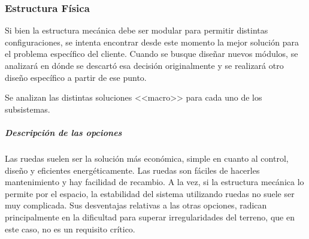 
\subsubsection{Estructura Física}

Si bien la estructura mecánica debe ser modular para permitir distintas configuraciones, se intenta encontrar desde este momento la mejor solución para el problema específico del cliente. Cuando se busque diseñar nuevos módulos, se analizará en dónde se descartó esa decisión originalmente y se realizará otro diseño específico a partir de ese punto.

Se analizan las distintas soluciones <<macro>> para cada uno de los subsistemas.

\paragraph{}

\subparagraph{Descripción de las opciones}
Las ruedas suelen ser la solución más económica, simple en cuanto al control, diseño y eficientes energéticamente. Las ruedas son fáciles de hacerles mantenimiento y hay facilidad de recambio. A la vez, si la estructura mecánica lo permite por el espacio, la estabilidad del sistema utilizando ruedas no suele ser muy complicada. Sus desventajas relativas a las otras opciones, radican principalmente en la dificultad para superar irregularidades del terreno, que en este caso, no es un requisito crítico.


